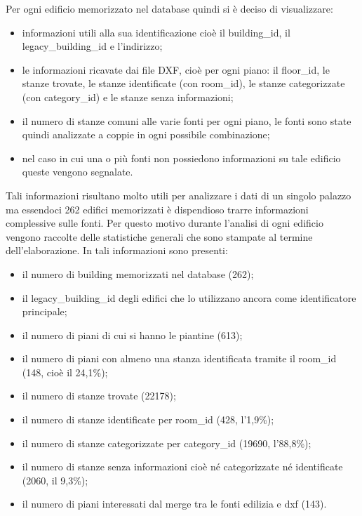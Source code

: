 \documentclass[12pt]{report}
\begin{document}
Per ogni edificio memorizzato nel database quindi si è deciso di visualizzare:
\begin{itemize}
\item informazioni utili alla sua identificazione cioè il building\_id, il legacy\_building\_id e l'indirizzo;
\item le informazioni ricavate dai file DXF, cioè per ogni piano: il floor\_id, le stanze trovate, le stanze identificate (con room\_id), le stanze categorizzate (con category\_id) e le stanze senza informazioni;
\item il numero di stanze comuni alle varie fonti per ogni piano, le fonti sono state quindi analizzate a coppie in ogni possibile combinazione; 
\item nel caso in cui una o più fonti non possiedono informazioni su tale edificio queste vengono segnalate.
\end{itemize}

Tali informazioni risultano molto utili per analizzare i dati di un singolo palazzo ma essendoci 262 edifici memorizzati è dispendioso trarre informazioni complessive sulle fonti.
Per questo motivo durante l'analisi di ogni edificio vengono raccolte delle statistiche generali che sono stampate al termine dell'elaborazione.
In tali informazioni sono presenti:
\begin{itemize}
\item il numero di building memorizzati nel database (262);
\item il legacy\_building\_id degli edifici che lo utilizzano ancora come identificatore principale;
\item il numero di piani di cui si hanno le piantine (613);
\item il numero di piani con almeno una stanza identificata tramite il room\_id (148, cioè il 24,1\%);
\item il numero di stanze trovate (22178);
\item il numero di stanze identificate per room\_id (428, l'1,9\%);
\item il numero di stanze categorizzate per category\_id (19690, l'88,8\%);
\item il numero di stanze senza informazioni cioè né categorizzate né identificate (2060, il 9,3\%);
\item il numero di piani interessati dal merge tra le fonti edilizia e dxf (143).
\end{itemize}

\vspace{5mm} %
\end{document}
